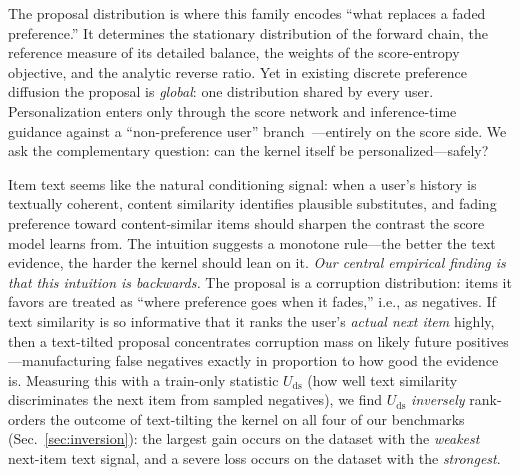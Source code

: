 \documentclass[letterpaper]{article}
\newcommand{\Uds}{U_{\mathrm{ds}}}
\begin{document}
The proposal distribution is where this family encodes ``what replaces
a faded preference.'' It determines the stationary distribution of the
forward chain, the reference measure of its detailed balance, the
weights of the score-entropy objective, and the analytic reverse ratio.
Yet in existing discrete preference diffusion the proposal is
\emph{global}: one distribution shared by every user. Personalization
enters only through the score network and inference-time guidance
against a ``non-preference user'' branch~\cite{prefergrow}---entirely on
the score side. We ask the complementary question: can the kernel
itself be personalized---safely?

Item text seems like the natural conditioning signal: when a user's
history is textually coherent, content similarity identifies plausible
substitutes, and fading preference toward content-similar items should
sharpen the contrast the score model learns from. The intuition
suggests a monotone rule---the better the text evidence, the harder the
kernel should lean on it. \emph{Our central empirical finding is that
this intuition is backwards.} The proposal is a corruption
distribution: items it favors are treated as ``where preference goes
when it fades,'' i.e., as negatives. If text similarity is so
informative that it ranks the user's \emph{actual next item} highly,
then a text-tilted proposal concentrates corruption mass on likely
future positives---manufacturing false negatives exactly in proportion
to how good the evidence is. Measuring this with a train-only statistic
$\Uds$ (how well text similarity discriminates the next item from
sampled negatives), we find $\Uds$ \emph{inversely} rank-orders the
outcome of text-tilting the kernel on all four of our benchmarks
(Sec.~\ref{sec:inversion}): the largest gain occurs on the dataset with
the \emph{weakest} next-item text signal, and a severe loss occurs on
the dataset with the \emph{strongest}.
\end{document}
